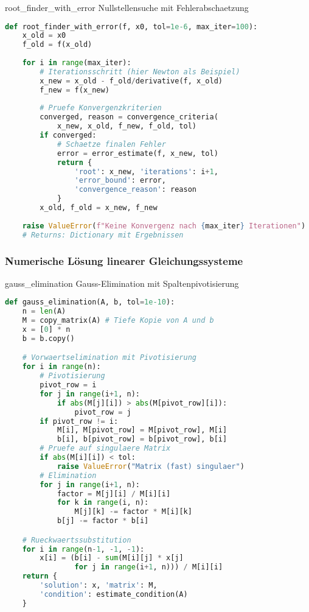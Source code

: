 \begin{examplecode}{root\_finder\_with\_error}
    Nullstellensuche mit Fehlerabschaetzung
\begin{lstlisting}[language=Python, style=basesmol]
def root_finder_with_error(f, x0, tol=1e-6, max_iter=100):
    x_old = x0
    f_old = f(x_old)
    
    for i in range(max_iter):
        # Iterationsschritt (hier Newton als Beispiel)
        x_new = x_old - f_old/derivative(f, x_old)
        f_new = f(x_new)
        
        # Pruefe Konvergenzkriterien
        converged, reason = convergence_criteria(
            x_new, x_old, f_new, f_old, tol)
        if converged:
            # Schaetze finalen Fehler
            error = error_estimate(f, x_new, tol)
            return {
                'root': x_new, 'iterations': i+1,
                'error_bound': error,
                'convergence_reason': reason
            }
        x_old, f_old = x_new, f_new
        
    raise ValueError(f"Keine Konvergenz nach {max_iter} Iterationen")
    # Returns: Dictionary mit Ergebnissen
\end{lstlisting}
\end{examplecode}

\subsubsection{Numerische Lösung linearer Gleichungssysteme}

\begin{examplecode}{gauss\_elimination} Gauss-Elimination mit Spaltenpivotisierung
\begin{lstlisting}[language=Python, style=basesmol]
def gauss_elimination(A, b, tol=1e-10):
    n = len(A)
    M = copy_matrix(A) # Tiefe Kopie von A und b
    x = [0] * n
    b = b.copy()

    # Vorwaertselimination mit Pivotisierung
    for i in range(n):
        # Pivotisierung
        pivot_row = i
        for j in range(i+1, n):
            if abs(M[j][i]) > abs(M[pivot_row][i]):
                pivot_row = j
        if pivot_row != i:
            M[i], M[pivot_row] = M[pivot_row], M[i]
            b[i], b[pivot_row] = b[pivot_row], b[i]
        # Pruefe auf singulaere Matrix
        if abs(M[i][i]) < tol:
            raise ValueError("Matrix (fast) singulaer")
        # Elimination
        for j in range(i+1, n):
            factor = M[j][i] / M[i][i]
            for k in range(i, n):
                M[j][k] -= factor * M[i][k]
            b[j] -= factor * b[i]

    # Rueckwaertssubstitution
    for i in range(n-1, -1, -1):
        x[i] = (b[i] - sum(M[i][j] * x[j] 
                for j in range(i+1, n))) / M[i][i]
    return {
        'solution': x, 'matrix': M,
        'condition': estimate_condition(A)
    }
\end{lstlisting}
\end{examplecode}


